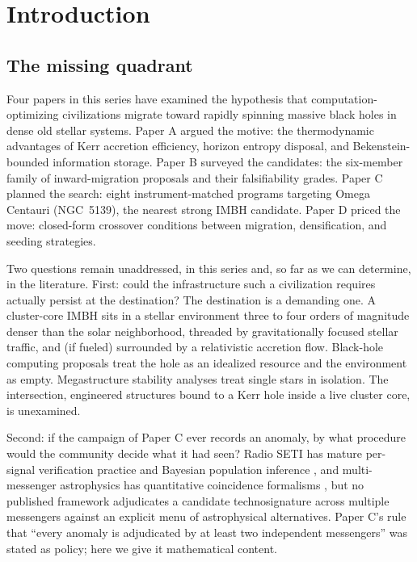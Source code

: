 \documentclass[11pt]{article}
\begin{document}
\section{Introduction}
\label{sec:intro}

\subsection{The missing quadrant}

Four papers in this series have examined the hypothesis that computation-optimizing civilizations migrate toward rapidly spinning massive black holes in dense old stellar systems. Paper A \citep{Swanson2026MTH} argued the motive: the thermodynamic advantages of Kerr accretion efficiency, horizon entropy disposal, and Bekenstein-bounded information storage. Paper B \citep{Swanson2026Review} surveyed the candidates: the six-member family of inward-migration proposals and their falsifiability grades. Paper C \citep{Swanson2026Campaign} planned the search: eight instrument-matched programs targeting Omega Centauri (NGC~5139), the nearest strong IMBH candidate. Paper D \citep{Swanson2026Economics} priced the move: closed-form crossover conditions between migration, densification, and seeding strategies.

Two questions remain unaddressed, in this series and, so far as we can determine, in the literature. First: could the infrastructure such a civilization requires actually persist at the destination? The destination is a demanding one. A cluster-core IMBH sits in a stellar environment three to four orders of magnitude denser than the solar neighborhood, threaded by gravitationally focused stellar traffic, and (if fueled) surrounded by a relativistic accretion flow. Black-hole computing proposals \citep{Inoue2011,Opatrny2017,Dvali2023} treat the hole as an idealized resource and the environment as empty. Megastructure stability analyses \citep{Wright2020,Raval2024,McInnes2026} treat single stars in isolation. The intersection, engineered structures bound to a Kerr hole inside a live cluster core, is unexamined.

Second: if the campaign of Paper C ever records an anomaly, by what procedure would the community decide what it had seen? Radio SETI has mature per-signal verification practice \citep{Sheikh2021,Li2026} and Bayesian population inference \citep{Grimaldi2018}, and multi-messenger astrophysics has quantitative coincidence formalisms \citep{Ashton2018,Breschi2024}, but no published framework adjudicates a candidate technosignature across multiple messengers against an explicit menu of astrophysical alternatives. Paper C's rule that ``every anomaly is adjudicated by at least two independent messengers'' was stated as policy; here we give it mathematical content.
\end{document}
